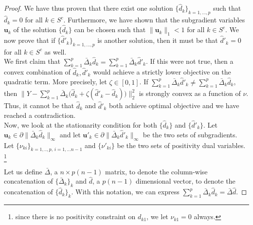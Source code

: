 \begin{proof}
We have thus proven that there exist one solution $\{ \hat{d}_k \}_{k=1,...,p}$ such that $\hat{d}_k = 0$ for all $k \in S^c$. Furthermore, we have shown that the subgradient variables $\mathbf{u}_k$ of the solution $\{ \hat{d}_k \}$ can be chosen such that $\| \mathbf{u}_k \|_1 < 1$ for all $k \in S^c$.  We now prove that if $\{ \hat{d}'_k \}_{k = 1,..., p}$ is another solution, then it must be that $\hat{d}'_k = 0$ for all $k \in S^c$ as well.  \\


We first claim that $\sum_{k=1}^p \bar{\Delta}_k \hat{d}_k = \sum_{k=1}^p \bar{\Delta}_k \hat{d}'_k$. If this were not true, then a convex combination of $\hat{d}_k, \hat{d}'_k$ would achieve a strictly lower objective on the quadratic term. More precisely, let $\zeta \in [0,1]$. If $\sum_{k=1}^p \bar{\Delta}_k \hat{d}'_k \neq \sum_{k=1}^p \bar{\Delta}_k \hat{d}_k$, then $\| Y - \sum_{k=1}^p \bar{\Delta}_k \big( \hat{d}_k + \zeta ( \hat{d}'_k - \hat{d}_k) \big) \|_2^2$ is strongly convex as a function of $\nu$. Thus, it cannot be that $\hat{d}_k$ and $\hat{d}'_k$ both achieve optimal objective and we have reached a contradiction.\\

Now, we look at the stationarity condition for both $\{ \hat{d}_k \}$ and $\{ \hat{d}'_k \}$. Let $\mathbf{u}_k \in \partial \| \bar{\Delta}_k \hat{d}_k \|_\infty$ and let $\mathbf{u}'_k \in \partial \| \bar{\Delta}_k \hat{d}'_k \|_\infty$ be the two sets of subgradients. Let $\{ \nu_{ki} \}_{k=1,..,p,\, i=1,...n-1}$ and $\{ \nu'_{ki} \}$ be the two sets of positivity dual variables. \footnote{since there is no positivity constraint on $d_{k1}$, we let $\nu_{k1} = 0$ always.}

Let us define $\bar{\Delta}$, a $n \times p(n-1)$ matrix, to denote the column-wise concatenation of $\{ \bar{\Delta}_k \}_k$ and $\hat{d}$, a $p(n-1)$ dimensional vector, to denote the concatenation of $\{ \hat{d}_k \}_k$. With this notation, we can express $\sum_{k=1}^p \bar{\Delta}_k \hat{d}_k = \bar{\Delta} \hat{d}$.


\end{proof}
